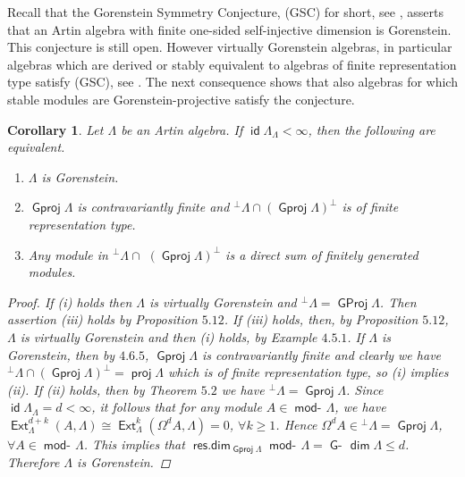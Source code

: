\documentclass[oneside, a4paper,reqno]{amsart}
\numberwithin{equation}{section}
\newtheorem{cor}[thm]{Corollary}
\theoremstyle{definition}
\begin{document}
Recall that the Gorenstein Symmetry Conjecture, \textsf{(GSC)} for
short, see \cite{ARS, BR, B:cm},  asserts that an Artin algebra with
finite one-sided self-injective dimension is Gorenstein. This
conjecture is still open. However virtually Gorenstein algebras, in
particular algebras which are derived or stably equivalent to
algebras of finite representation type satisfy (\textsf{GSC}), see
\cite{B:cm}. The next consequence shows that also algebras for which
stable modules are Gorenstein-projective satisfy the conjecture.

\begin{cor} Let $\Lambda$ be an Artin algebra. If $\operatorname*{\mathsf{id}}\Lambda_{\Lambda} < \infty$, then the following are equivalent.
\begin{enumerate}
 \item $\Lambda$ is Gorenstein.
  \item  ${\operatorname{\mathsf{Gproj}}\nolimits}\Lambda$ is contravariantly finite and
  ${^{\bot}}\Lambda \cap ({\operatorname{\mathsf{Gproj}}\nolimits}\Lambda)^{\bot}$ is of finite representation type.
\item Any module in ${^{\pmb{\bot}}}\Lambda \cap$ $({\operatorname{\mathsf{Gproj}}\nolimits}\Lambda)^{\pmb{\bot}}$ is a
 direct sum of finitely generated modules.
\end{enumerate}
\begin{proof} If (i) holds then $\Lambda$ is virtually Gorenstein and ${^{\pmb{\bot}}}\Lambda = {\operatorname{\mathsf{GProj}}\nolimits}\Lambda$.
Then assertion (iii) holds by Proposition $5.12$.   If (iii) holds,
then, by Proposition $5.12$, $\Lambda$ is virtually Gorenstein and
then (i) holds, by Example $4.5.1$.  If $\Lambda$ is Gorenstein,
then by $4.6.5$, ${\operatorname{\mathsf{Gproj}}\nolimits}\Lambda$ is contravariantly finite and
clearly we have ${^{\bot}}\Lambda \cap ({\operatorname{\mathsf{Gproj}}\nolimits}\Lambda)^{\bot} =
\operatorname*{\mathsf{proj}}\Lambda$ which is of finite representation type, so (i) implies
(ii).  If (ii) holds, then by Theorem $5.2$ we have
${^{\bot}}\Lambda = {\operatorname{\mathsf{Gproj}}\nolimits}\Lambda$. Since $\operatorname*{\mathsf{id}}\Lambda_{\Lambda} = d
<\infty$, it follows that for any module $A \in \operatorname*{\mathsf{mod}-\!}\Lambda$, we
have $\operatorname*{\mathsf{Ext}}^{d+k}_{\Lambda}(A,\Lambda) \cong
\operatorname*{\mathsf{Ext}}^{k}_{\Lambda}(\Omega^{d}A,\Lambda) = 0$, $\forall k \geq 1$.
Hence $\Omega^{d}A \in {^{\bot}}\Lambda = {\operatorname{\mathsf{Gproj}}\nolimits}\Lambda$, $\forall A
\in \operatorname*{\mathsf{mod}-\!}\Lambda$. This implies that
$\operatorname*{\mathsf{res.dim}}_{{\operatorname{\mathsf{Gproj}}\nolimits}\Lambda}\operatorname*{\mathsf{mod}-\!}\Lambda  = \operatorname*{\mathsf{G}-\!}\operatorname*{\mathsf{dim}} \Lambda \leq d$.
Therefore $\Lambda$ is Gorenstein.
\end{proof}
\end{cor}
\end{document}
